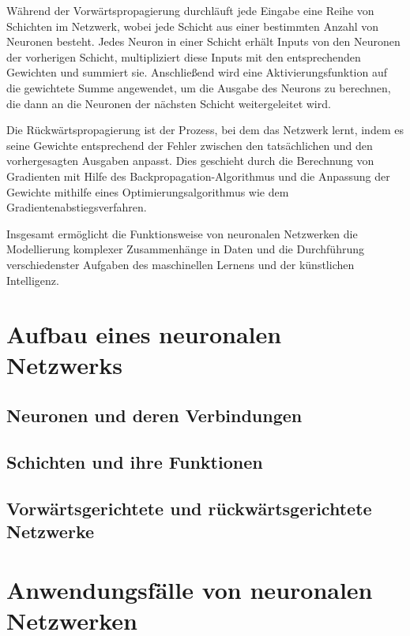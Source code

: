 Während der Vorwärtspropagierung durchläuft jede Eingabe eine Reihe von Schichten im Netzwerk, wobei jede Schicht aus einer bestimmten Anzahl von Neuronen besteht. Jedes Neuron in einer Schicht erhält Inputs von den Neuronen der vorherigen Schicht, multipliziert diese Inputs mit den entsprechenden Gewichten und summiert sie. Anschließend wird eine Aktivierungsfunktion auf die gewichtete Summe angewendet, um die Ausgabe des Neurons zu berechnen, die dann an die Neuronen der nächsten Schicht weitergeleitet wird.

Die Rückwärtspropagierung ist der Prozess, bei dem das Netzwerk lernt, indem es seine Gewichte entsprechend der Fehler zwischen den tatsächlichen und den vorhergesagten Ausgaben anpasst. Dies geschieht durch die Berechnung von Gradienten mit Hilfe des Backpropagation-Algorithmus und die Anpassung der Gewichte mithilfe eines Optimierungsalgorithmus wie dem Gradientenabstiegsverfahren.

Insgesamt ermöglicht die Funktionsweise von neuronalen Netzwerken die Modellierung komplexer Zusammenhänge in Daten und die Durchführung verschiedenster Aufgaben des maschinellen Lernens und der künstlichen Intelligenz.

\section{Aufbau eines neuronalen Netzwerks}
\label{sec:Grundlagen_neuronale_Netzwerke}
\subsection{Neuronen und deren Verbindungen}
\label{sec:Grundlagen_neuronale_Netzwerke_Grundlagen}
\subsection{Schichten und ihre Funktionen}
\label{sec:Grundlagen_neuronale_Netzwerke_Aufbau}
\subsection{Vorwärtsgerichtete und rückwärtsgerichtete Netzwerke}
\label{sec:Grundlagen_neuronale_Netzwerke_Aufbau}

\section{Anwendungsfälle von neuronalen Netzwerken}
\label{sec:Grundlagen_neuronale_Netzwerke}

